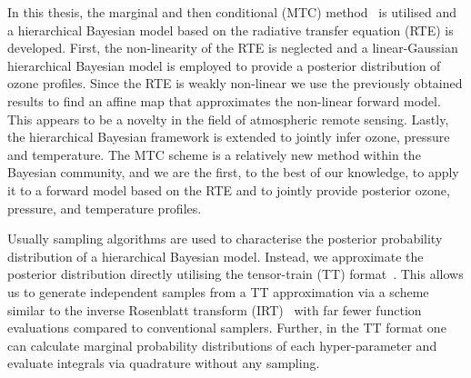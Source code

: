 In this thesis, the marginal and then conditional (MTC) method~\cite{fox2016fast} is utilised and a hierarchical Bayesian model based on the radiative transfer equation (RTE) is developed.
First, the non-linearity of the RTE is neglected and a linear-Gaussian hierarchical Bayesian model is employed to provide a posterior distribution of ozone profiles.
Since the RTE is weakly non-linear we use the previously obtained results to find an affine map that approximates the non-linear forward model.
This appears to be a novelty in the field of atmospheric remote sensing.
Lastly, the hierarchical Bayesian framework is extended to jointly infer ozone, pressure and temperature.
The MTC scheme is a relatively new method within the Bayesian community, and we are the first, to the best of our knowledge, to apply it to a forward model based on the RTE and to jointly provide posterior ozone, pressure, and temperature profiles.

Usually sampling algorithms are used to characterise the posterior probability distribution of a hierarchical Bayesian model. Instead, we approximate the posterior distribution directly utilising the tensor-train (TT) format~\cite{cui2022deep}. 
This allows us to generate independent samples from a TT approximation via a scheme similar to the inverse Rosenblatt transform (IRT)~\cite{dolgov2020approximation} with far fewer function evaluations compared to conventional samplers.
Further, in the TT format one can calculate marginal probability distributions of each hyper-parameter and evaluate integrals via quadrature without any sampling.


